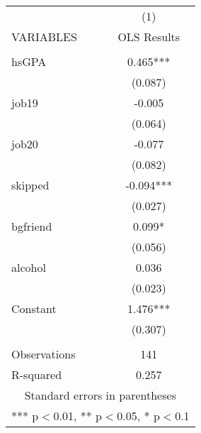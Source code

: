\documentclass[]{article}
\begin{document}
\begin{tabular}{lc} \hline
 & (1) \\
VARIABLES & OLS Results \\ \hline
 &  \\
hsGPA & 0.465*** \\
 & (0.087) \\
job19 & -0.005 \\
 & (0.064) \\
job20 & -0.077 \\
 & (0.082) \\
skipped & -0.094*** \\
 & (0.027) \\
bgfriend & 0.099* \\
 & (0.056) \\
alcohol & 0.036 \\
 & (0.023) \\
Constant & 1.476*** \\
 & (0.307) \\
 &  \\
Observations & 141 \\
 R-squared & 0.257 \\ \hline
\multicolumn{2}{c}{ Standard errors in parentheses} \\
\multicolumn{2}{c}{ *** p$<$0.01, ** p$<$0.05, * p$<$0.1} \\
\end{tabular}
\end{document}
